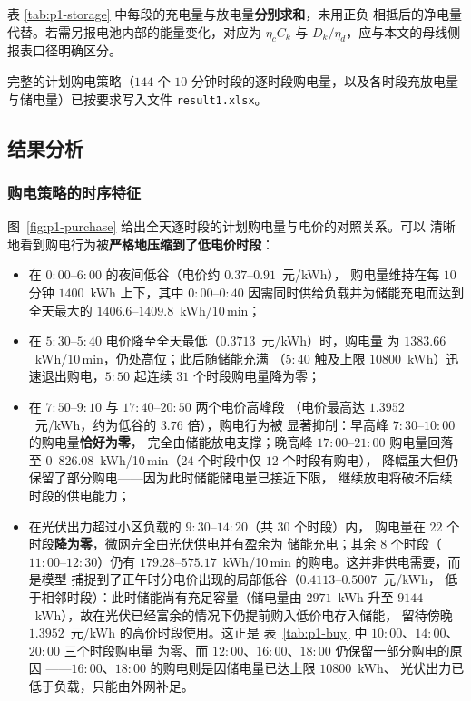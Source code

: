 \documentclass[withoutpreface,bwprint]{cumcmthesis}
\begin{document}
表 \ref{tab:p1-storage} 中每段的充电量与放电量\textbf{分别求和}，未用正负
相抵后的净电量代替。若需另报电池内部的能量变化，对应为 $\eta_c C_k$ 与
$D_k/\eta_d$，应与本文的母线侧报表口径明确区分。

完整的计划购电策略（$144$ 个 $10$ 分钟时段的逐时段购电量，以及各时段充放电量
与储电量）已按要求写入文件 \texttt{result1.xlsx}。

\subsection{结果分析}

\subsubsection{购电策略的时序特征}

图~\ref{fig:p1-purchase} 给出全天逐时段的计划购电量与电价的对照关系。可以
清晰地看到购电行为被\textbf{严格地压缩到了低电价时段}：

\begin{itemize}
  \item 在 $0{:}00$--$6{:}00$ 的夜间低谷（电价约 $0.37$--$0.91$~元/kWh），
        购电量维持在每 $10$ 分钟 $1400$~kWh 上下，其中 $0{:}00$--$0{:}40$
        因需同时供给负载并为储能充电而达到全天最大的
        $1406.6$--$1409.8$~kWh/10\,min；
  \item 在 $5{:}30$--$5{:}40$ 电价降至全天最低（$0.3713$~元/kWh）时，购电量
        为 $1383.66$~kWh/10\,min，仍处高位；此后随储能充满
        （$5{:}40$ 触及上限 $10800$~kWh）迅速退出购电，$5{:}50$ 起连续
        $31$ 个时段购电量降为零；
  \item 在 $7{:}50$--$9{:}10$ 与 $17{:}40$--$20{:}50$ 两个电价高峰段
        （电价最高达 $1.3952$~元/kWh，约为低谷的 $3.76$ 倍），购电行为被
        显著抑制：早高峰 $7{:}30$--$10{:}00$ 的购电量\textbf{恰好为零}，
        完全由储能放电支撑；晚高峰 $17{:}00$--$21{:}00$ 购电量回落至
        $0$--$826.08$~kWh/10\,min（$24$ 个时段中仅 $12$ 个时段有购电），
        降幅虽大但仍保留了部分购电——因为此时储能储电量已接近下限，
        继续放电将破坏后续时段的供电能力；
  \item 在光伏出力超过小区负载的 $9{:}30$--$14{:}20$（共 $30$ 个时段）内，
        购电量在 $22$ 个时段\textbf{降为零}，微网完全由光伏供电并有盈余为
        储能充电；其余 $8$ 个时段（$11{:}00$--$12{:}30$）仍有
        $179.28$--$575.17$~kWh/10\,min 的购电。这并非供电需要，而是模型
        捕捉到了正午时分电价出现的局部低谷（$0.4113$--$0.5007$~元/kWh，
        低于相邻时段）：此时储能尚有充足容量（储电量由 $2971$~kWh 升至
        $9144$~kWh），故在光伏已经富余的情况下仍提前购入低价电存入储能，
        留待傍晚 $1.3952$~元/kWh 的高价时段使用。这正是
        表~\ref{tab:p1-buy} 中 $10{:}00$、$14{:}00$、$20{:}00$ 三个时段购电量
        为零、而 $12{:}00$、$16{:}00$、$18{:}00$ 仍保留一部分购电的原因
        ——$16{:}00$、$18{:}00$ 的购电则是因储电量已达上限 $10800$~kWh、
        光伏出力已低于负载，只能由外网补足。
\end{itemize}
\end{document}
